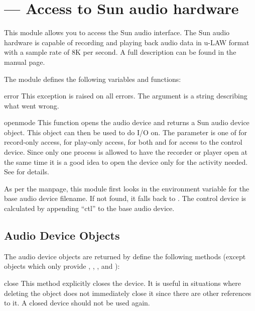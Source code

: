 \section{ ---
         Access to Sun audio hardware}



This module allows you to access the Sun audio interface. The Sun
audio hardware is capable of recording and playing back audio data
in u-LAW format with a sample rate of 8K per second. A
full description can be found in the  manual page.

The module defines the following variables and functions:

\begin{excdesc}{error}
This exception is raised on all errors. The argument is a string
describing what went wrong.
\end{excdesc}

\begin{funcdesc}{open}{mode}
This function opens the audio device and returns a Sun audio device
object. This object can then be used to do I/O on. The  parameter
is one of  for record-only access,  for play-only
access,  for both and  for access to the
control device. Since only one process is allowed to have the recorder
or player open at the same time it is a good idea to open the device
only for the activity needed. See  for details.

As per the manpage, this module first looks in the environment
variable  for the base audio device filename.  If not
found, it falls back to .  The control device is
calculated by appending ``ctl'' to the base audio device.
\end{funcdesc}


\subsection{Audio Device Objects}
\label{audio-device-objects}

The audio device objects are returned by  define the
following methods (except  objects which only provide
, , , and
):

\begin{methoddesc}{close}{}
This method explicitly closes the device. It is useful in situations
where deleting the object does not immediately close it since there
are other references to it. A closed device should not be used again.
\end{methoddesc}

